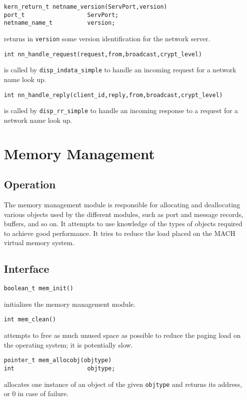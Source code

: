 \begin{verbatim}
kern_return_t netname_version(ServPort,version)
port_t                  ServPort;
netname_name_t          version;
\end{verbatim}
returns in \verb"version" some version identification for the network server.

\begin{verbatim}
int nn_handle_request(request,from,broadcast,crypt_level)
\end{verbatim}
is called by \verb"disp_indata_simple" to handle an incoming request for a
network name look up.

\begin{verbatim}
int nn_handle_reply(client_id,reply,from,broadcast,crypt_level)
\end{verbatim}
is called by \verb"disp_rr_simple" to handle an incoming response to a
request for a network name look up.

\section{Memory Management}
\subsection{Operation}
The memory management module is responsible for allocating and deallocating
various objects used by the different modules, such as port and message
records, buffers, and so on.  It attempts to use knowledge of the types of
objects required to achieve good performance.  It tries to reduce the load
placed on the MACH virtual memory system.

\subsection{Interface}
\begin{verbatim}
boolean_t mem_init()
\end{verbatim}
initializes the memory management module.

\begin{verbatim}
int mem_clean()
\end{verbatim}
attempts to free as much unused space as possible to reduce the paging load
on the operating system;  it is potentially slow. 

\begin{verbatim}
pointer_t mem_allocobj(objtype)
int                     objtype;
\end{verbatim}
allocates one instance of an object of the given \verb"objtype" and
returns its address, or 0 in case of failure.

